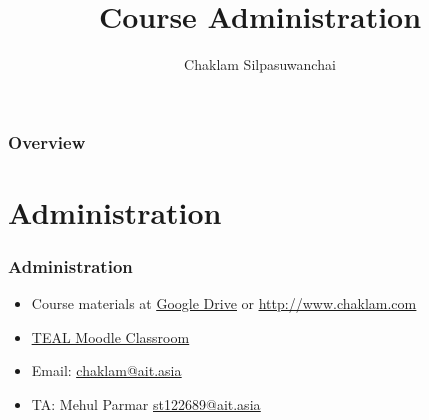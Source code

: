 \documentclass{beamer}
\title[Course Administration]{Course Administration} %
\author{Chaklam Silpasuwanchai} %
\institute[AIT] %
{
Asian Institute of Technology \\ %
\medskip
\textit{chaklam@ait.asia} %
}
\date{} %
\begin{document}
\begin{frame}
\titlepage %
\end{frame}

\begin{frame}
\frametitle{Overview} %
\tableofcontents %
\end{frame}



\section{Administration} %

\begin{frame}
\frametitle{Administration}
\begin{itemize}
	\item Course materials at \underline{\href{https://drive.google.com/drive/folders/1cHWrCKnRc1_xkWr_IgW4X-iBqm1hsnhP?usp=sharing}{Google Drive}} or \underline{\url{http://www.chaklam.com}}
	\item \underline{\href{https://teal2o.cs.ait.ac.th}{TEAL Moodle Classroom}}
	\item Email: \underline{\href{mailto:chaklam@ait.asia}{chaklam@ait.asia}} 
    \item TA: Mehul Parmar \underline{\href{mailto:st123175@ait.asia}{st122689@ait.asia}} 
\end{itemize}
\vspace{0.2cm}
\end{frame}
\end{document}
